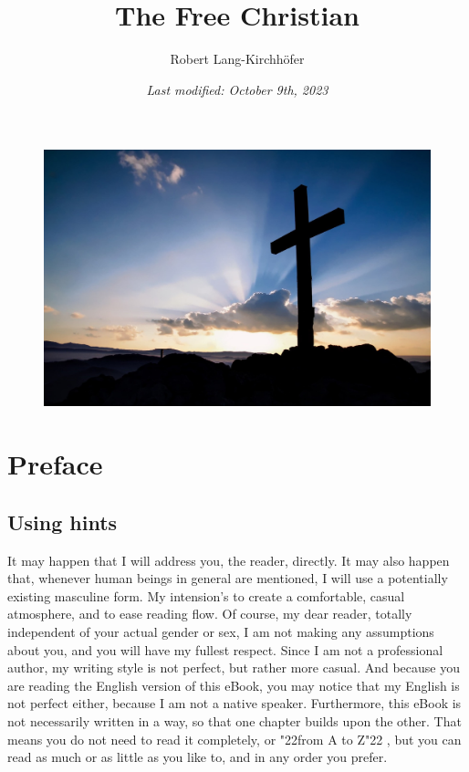 \documentclass[12pt,a4paper]{article}
\title{\textbf{The Free Christian}}
\author{Robert Lang-Kirchh\"ofer}
\date{\textit{Last modified: October 9th, 2023}}
\newcommand{\q}[1]{\char"22{#1}\char"22 }
\begin{document}
	\setlength{\parindent}{0mm}
	\maketitle
	\begin{figure}[h]
		\centering
		\includegraphics[width=1\textwidth,keepaspectratio]{"FreeChristian.jpeg"}
	\end{figure}

	\newpage
	\tableofcontents

	\newpage
	\section{Preface}

	\subsection{Using hints}
		It may happen that I will address you,
		the reader,
		directly.
		It may also happen that,
		whenever human beings in general are mentioned,
		I will use a potentially existing masculine form.
		My intension's to create a comfortable,
		casual atmosphere,
		and to ease reading flow.
		Of course,
		my dear reader,
		totally independent of your actual gender or sex,
		I am not making any assumptions about you,
		and you will have my fullest respect.
		Since I am not a professional author,
		my writing style is not perfect,
		but rather more casual.
		And because you are reading the English version of this eBook,
		you may notice that my English is not perfect either,
		because I am not a native speaker.
		Furthermore,
		this eBook is not necessarily written in a way,
		so that one chapter builds upon the other.
		That means you do not need to read it completely,
		or \q{from A to Z},
		but you can read as much or as little as you like to,
		and in any order you prefer.
	
\end{document}
